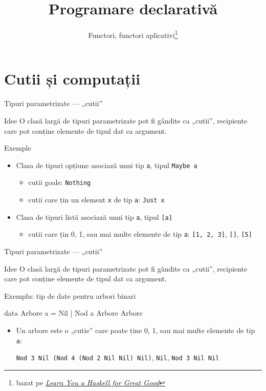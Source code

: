 \documentclass[xcolor=pdftex,romanian,colorlinks]{beamer}
\title[PD---Meta-Programare]{Programare declarativă}
\subtitle{Functori, functori aplicativi\thanks{bazat pe \emph{\href{http://learnyouahaskell.com/functors-applicative-functors-and-monoids}{Learn You a Haskell for Great Good}}}}
\begin{document}
\begin{frame}
  \titlepage
\end{frame}

\section{Cutii și computații}

\begin{frame}[fragile]{Tipuri parametrizate --- „cutii”}
\begin{block}{Idee}
O clasă largă de tipuri parametrizate pot fi gândite ca „cutii”, recipiente care pot conține elemente de tipul dat ca argument.
\end{block}
\vfill
\begin{block}{Exemple}
\begin{itemize}
\item Clasa de tipuri opțiune asociază unui tip \lstinline$a$, tipul \lstinline$Maybe a$
\begin{itemize}
\item cutii goale: \lstinline$Nothing$
\item cutii care țin un element \lstinline$x$ de tip \lstinline$a$: \lstinline$Just x$
\end{itemize}
\item Clasa de tipuri listă asociază unui tip \lstinline$a$, tipul \lstinline$[a]$
\begin{itemize}
\item cutii care țin 0, 1, sau mai multe elemente de tip \lstinline$a$: \lstinline$[1, 2, 3]$, \lstinline$[]$, \lstinline$[5]$
\end{itemize}
\end{itemize}
\end{block}
\end{frame}


\begin{frame}[fragile]{Tipuri parametrizate --- „cutii”}
\begin{block}{Idee}
O clasă largă de tipuri parametrizate pot fi gândite ca „cutii”, recipiente care pot conține elemente de tipul dat ca argument.
\end{block}
\vfill
\begin{block}{Exemplu: tip de date pentru arbori binari}
\begin{asciihs}
data Arbore a = Nil
              | Nod a Arbore Arbore
\end{asciihs}
\begin{itemize}
\item Un arbore este o „cutie” care poate ține 0, 1, sau mai multe elemente de tip \lstinline$a$:

\lstinline$Nod 3 Nil (Nod 4 (Nod 2 Nil Nil) Nil)$, \lstinline$Nil$, \lstinline$Nod 3 Nil Nil$
\end{itemize}
\end{block}
\end{frame}
\end{document}
